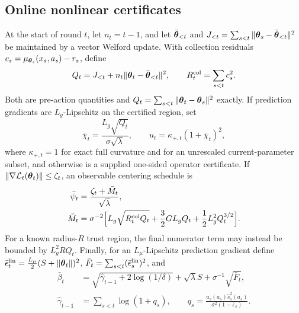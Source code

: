 \subsection{Online nonlinear certificates}\label{sec:operational-certificates}
At the start of round $t$, let $n_t=t-1$, and let $\bar{\boldsymbol{\theta}}_{<t}$ and
$J_{<t}=\sum_{s<t}\|\boldsymbol{\theta}_s-\bar{\boldsymbol{\theta}}_{<t}\|^2$ be maintained by a
vector Welford update.  With collection residuals
$c_s=\mu_{\boldsymbol{\theta}_s}(x_s,a_s)-r_s$, define
\begin{equation}\label{eq:path-stats-main}
 Q_t=J_{<t}+n_t\|\boldsymbol{\theta}_t-\bar{\boldsymbol{\theta}}_{<t}\|^2,
 \qquad R_t^{\rm col}=\sum_{s<t}c_s^2.
\end{equation}
Both are pre-action quantities and
$Q_t=\sum_{s<t}\|\boldsymbol{\theta}_t-\boldsymbol{\theta}_s\|^2$ exactly.  If prediction gradients
are $L_g$-Lipschitz on the certified region, set
\begin{equation}\label{eq:operational-transfer-main}
 \bar\chi_t=\frac{L_g\sqrt{Q_t}}{\sigma\sqrt\lambda},\qquad
 u_t=\kappa_{+,t}(1+\bar\chi_t)^2,
\end{equation}
where $\kappa_{+,t}=1$ for exact full curvature and for an unrescaled
current-parameter subset, and otherwise is a supplied one-sided operator
certificate.  If $\|\nabla\mathcal{L}_t(\boldsymbol{\theta}_t)\|\le\zeta_t$, an observable
centering schedule is
\begin{equation}\label{eq:operational-centering-main}
\begin{aligned}
 \bar\psi_t&=\frac{\zeta_t+\bar M_t}{\sqrt\lambda},\\
 \bar M_t&=\sigma^{-2}\Bigl[L_g\sqrt{R_t^{\rm col}Q_t}
 +\frac{3}{2}GL_gQ_t+\frac{1}{2}L_g^2Q_t^{3/2}\Bigr].
\end{aligned}
\end{equation}
For a known radius-$R$ trust region, the final numerator term may instead
be bounded by $L_g^2RQ_t$.  Finally, for an $L_\mu$-Lipschitz prediction gradient define
$\bar\epsilon_t^{\rm lin}=\frac{L_\mu}{2}(S+\|\boldsymbol{\theta}_t\|)^2$,
$\bar F_t=\sum_{s<t}(\bar\epsilon_s^{\rm lin})^2$, and
\begin{equation}\label{eq:operational-beta-main}
\begin{aligned}
 \bar\beta_t&=\sqrt{\hat\gamma_{t-1}+2\log(1/\delta)}+\sqrt\lambda S
 +\sigma^{-1}\sqrt{\bar F_t},\\
 \hat\gamma_{t-1}&=\sum_{s<t}\log(1+q_s),\qquad
 q_s=\frac{u_s(a_s)\tilde s_s^2(a_s)}{\sigma^2(1-\bar\varepsilon_s)}.
\end{aligned}
\end{equation}

